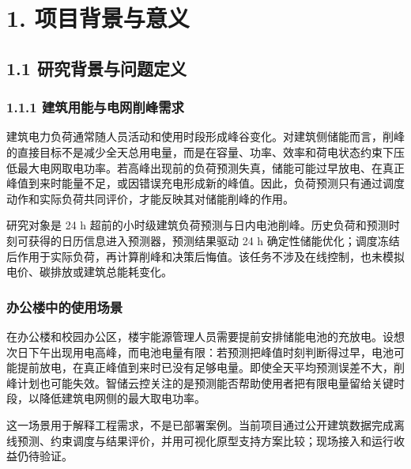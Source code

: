 \documentclass[12pt,a4paper]{article}
\begin{document}
\section{1. 项目背景与意义}
\subsection{1.1 研究背景与问题定义}
\subsubsection{1.1.1 建筑用能与电网削峰需求}
建筑电力负荷通常随人员活动和使用时段形成峰谷变化。对建筑侧储能而言，削峰的直接目标不是减少全天总用电量，而是在容量、功率、效率和荷电状态约束下压低最大电网取电功率。若高峰出现前的负荷预测失真，储能可能过早放电、在真正峰值到来时能量不足，或因错误充电形成新的峰值。因此，负荷预测只有通过调度动作和实际负荷共同评价，才能反映其对储能削峰的作用。\par
研究对象是 24 h 超前的小时级建筑负荷预测与日内电池削峰。历史负荷和预测时刻可获得的日历信息进入预测器，预测结果驱动 24 h 确定性储能优化；调度冻结后作用于实际负荷，再计算削峰和决策后悔值。该任务不涉及在线控制，也未模拟电价、碳排放或建筑总能耗变化。\par
\subsubsection{办公楼中的使用场景}
在办公楼和校园办公区，楼宇能源管理人员需要提前安排储能电池的充放电。设想次日下午出现用电高峰，而电池电量有限：若预测把峰值时刻判断得过早，电池可能提前放电，在真正峰值到来时已没有足够电量。即使全天平均预测误差不大，削峰计划也可能失效。智储云控关注的是预测能否帮助使用者把有限电量留给关键时段，以降低建筑电网侧的最大取电功率。\par
这一场景用于解释工程需求，不是已部署案例。当前项目通过公开建筑数据完成离线预测、约束调度与结果评价，并用可视化原型支持方案比较；现场接入和运行收益仍待验证。\par
\end{document}
